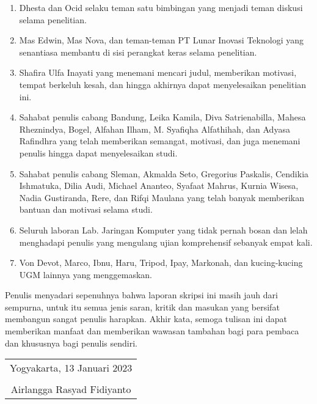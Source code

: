 \begin{enumerate}
	\item Dhesta dan Ocid selaku teman satu bimbingan yang menjadi teman diskusi selama penelitian.
	
	\item Mas Edwin, Mas Nova, dan teman-teman PT Lunar Inovasi Teknologi yang senantiasa membantu di sisi perangkat keras selama penelitian.
	
	\item Shafira Ulfa Inayati yang menemani mencari judul, memberikan motivasi, tempat berkeluh kesah, dan hingga akhirnya dapat menyelesaikan penelitian ini.
	
	\item Sahabat penulis cabang Bandung, Leika Kamila, Diva Satrienabilla, Mahesa Rheznindya, Bogel, Alfahan Ilham, M. Syafiqha Alfathihah, dan Adyasa Rafindhra yang telah memberikan semangat, motivasi, dan juga menemani penulis hingga dapat menyelesaikan studi.
	
	\item Sahabat penulis cabang Sleman, Akmalda Seto, Gregorius Paskalis, Cendikia Ishmatuka, Dilia Audi, Michael Ananteo, Syafaat Mahrus, Kurnia Wisesa, Nadia Gustiranda, Rere, dan Rifqi Maulana yang telah banyak memberikan bantuan dan motivasi selama studi.
	
	\item Seluruh laboran Lab. Jaringan Komputer yang tidak pernah bosan dan lelah menghadapi penulis yang mengulang ujian komprehensif sebanyak empat kali.
	
	\item Von Devot, Marco, Ibnu, Haru, Tripod, Ipay, Markonah, dan kucing-kucing UGM lainnya yang menggemaskan.

\end{enumerate}

Penulis menyadari sepenuhnya bahwa laporan skripsi ini masih jauh dari sempurna, untuk itu semua jenis saran, kritik dan masukan yang bersifat membangun sangat penulis harapkan. Akhir kata, semoga tulisan ini dapat memberikan manfaat dan memberikan wawasan tambahan bagi para pembaca dan khususnya bagi penulis sendiri.

\begin{flushright}
	\begin{tabular}{c}
		Yogyakarta, 13 Januari 2023 \\
		\vspace{1cm} \\
		Airlangga Rasyad Fidiyanto
	\end{tabular}
\end{flushright}